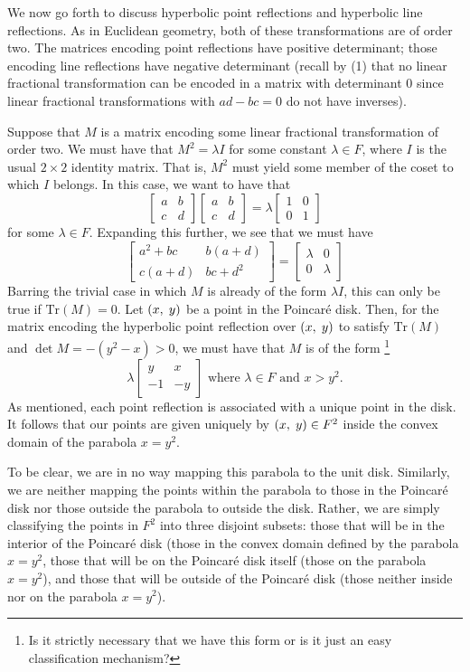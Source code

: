 \documentclass[12pt]{article}
\newcommand{\poincare}{Poincar\'{e} }
\newcommand{\Tr}{\text{Tr}}
\newcommand{\ttc}{, \hspace{1mm}}
\newcommand{\lftmat}[4]{\begin{bmatrix} {#1} & {#2} \\ {#3} & {#4} \end{bmatrix}}
\newcommand{\stanlftmat}{\lftmat{a}{b}{c}{d}}
\newcommand{\pointmat}[2]{\lftmat{{#2}}{{#1}}{-1}{-{#2}}}
\newcommand{\stanpointmat}{\pointmat{x}{y}}
\begin{document}
We now go forth to discuss hyperbolic point reflections and hyperbolic line reflections. As in Euclidean geometry, both of these transformations are of order two. The matrices encoding point reflections have positive determinant; those encoding line reflections have negative determinant (recall by (1) that no linear fractional transformation can be encoded in a matrix with determinant 0 since linear fractional transformations with $ad - bc = 0$ do not have inverses). 

Suppose that $M$ is a matrix encoding some linear fractional transformation of order two. We must have that $M^2 = \lambda I$ for some constant $\lambda \in F$, where $I$ is the usual $2 \times 2$ identity matrix. That is, $M^2$ must yield some member of the coset to which $I$ belongs. In this case, we want to have that 
	\[
		\stanlftmat \stanlftmat = \lambda \lftmat{1}{0}{0}{1}
	\]
for some $\lambda \in F$. Expanding this further, we see that we must have 
	\[
		\lftmat{a^2 + bc}{b(a+d)}{c(a+d)}{bc+d^2} =  \lftmat{\lambda}{0}{0}{\lambda}
	\]
Barring the trivial case in which $M$ is already of the form $\lambda I$, this can only be true if $\Tr(M) = 0$. Let $(x \ttc y)$ be a point in the \poincare disk. Then, for the matrix encoding the hyperbolic point reflection over $(x \ttc y)$ to satisfy $\Tr(M)$ and $\det M = -(y^2 - x) > 0$, we must have that $M$ is of the form \footnote{Is it strictly necessary that we have this form or is it just an easy classification mechanism?} 
\begin{equation} 
	\lambda \stanpointmat \text{ where } \lambda \in F \text{ and } x > y^2. 
\end{equation}	
As mentioned, each point reflection is associated with a unique point in the disk. It follows that our points are given uniquely by $(x \ttc y) \in F^2$ inside the convex domain of the parabola $x = y^2$.

To be clear, we are in no way mapping this parabola to the unit disk. Similarly, we are neither mapping the points within the parabola to those in the \poincare disk nor those outside the parabola to outside the disk. Rather, we are simply classifying the points in $F^2$ into three disjoint subsets: those that will be in the interior of the \poincare disk (those in the convex domain defined by the parabola $x = y^2$, those that will be on the \poincare disk itself (those on the parabola $x = y^2$), and those that will be outside of the \poincare disk (those neither inside nor on the parabola $x = y^2$). 
\end{document}
